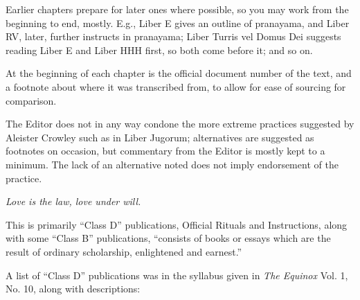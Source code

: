 Earlier chapters prepare for later ones where possible, so you may work from the beginning to end, mostly. E.g., Liber E gives an outline of pranayama, and Liber RV, later, further instructs in pranayama; Liber Turris vel Domus Dei suggests reading Liber E and Liber HHH first, so both come before it; and so on.

At the beginning of each chapter is the official document number of the text, and a footnote about where it was transcribed from, to allow for ease of sourcing for comparison.

The Editor does not in any way condone the more extreme practices suggested by Aleister Crowley such as in Liber Jugorum; alternatives are suggested as footnotes on occasion, but commentary from the Editor is mostly kept to a minimum. The lack of an alternative noted does not imply endorsement of the practice.

\textit{Love is the law, love under will.}



This is primarily \enquote{Class D} publications, Official Rituals and Instructions, along with some \enquote{Class B} publications, \enquote{consists of books or essays which are the result of ordinary scholarship, enlightened and earnest.}

A list of \enquote{Class D} publications was in the syllabus given in \textit{The Equinox} Vol. 1, No. 10, along with descriptions:

